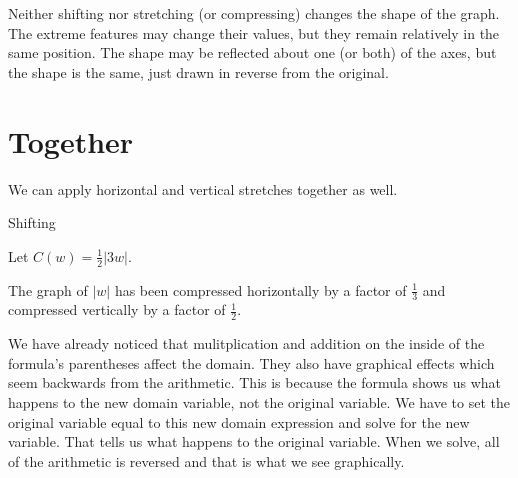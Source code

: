 \documentclass{ximera}
\begin{document}
Neither shifting nor stretching (or compressing) changes the shape of the graph.  The extreme features may change their values, but they remain relatively in the same position.  The shape may be reflected about one (or both) of the axes, but the shape is the same, just drawn in reverse from the original.





\section{Together}

We can apply horizontal and vertical stretches together as well.





\begin{example}  Shifting

Let $C(w) = \frac{1}{2}|3w|$.


\begin{image}
\end{image}

\end{example}

The graph of $|w|$ has been compressed horizontally by a factor of $\frac{1}{3}$ and compressed vertically by a factor of $\frac{1}{2}$.




We have already noticed that mulitplication and addition on the inside of the formula's parentheses affect the domain.  They also have graphical effects which seem backwards from the arithmetic.  This is because the formula shows us what happens to the new domain variable, not the original variable.  We have to set the original variable equal to this new domain expression and solve for the new variable.  That tells us what happens to the original variable.  When we solve, all of the arithmetic is reversed and that is what we see graphically.
\end{document}

